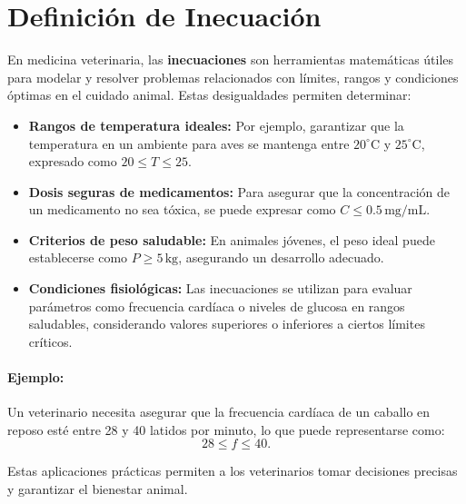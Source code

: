 \documentclass[a4,11pt]{aleph-notas}
\begin{document}
\encabezado

\section{Definición de Inecuación}

En medicina veterinaria, las \textbf{inecuaciones} son herramientas matemáticas útiles para modelar y resolver problemas relacionados con límites, rangos y condiciones óptimas en el cuidado animal. Estas desigualdades permiten determinar:

\begin{itemize}
    \item \textbf{Rangos de temperatura ideales:} Por ejemplo, garantizar que la temperatura en un ambiente para aves se mantenga entre \(20^\circ \text{C}\) y \(25^\circ \text{C}\), expresado como \(20 \leq T \leq 25\).
    
    \item \textbf{Dosis seguras de medicamentos:} Para asegurar que la concentración de un medicamento no sea tóxica, se puede expresar como \(C \leq 0.5 \, \text{mg/mL}\).
    
    \item \textbf{Criterios de peso saludable:} En animales jóvenes, el peso ideal puede establecerse como \(P \geq 5 \, \text{kg}\), asegurando un desarrollo adecuado.
    
    \item \textbf{Condiciones fisiológicas:} Las inecuaciones se utilizan para evaluar parámetros como frecuencia cardíaca o niveles de glucosa en rangos saludables, considerando valores superiores o inferiores a ciertos límites críticos.
\end{itemize}

\paragraph{Ejemplo:} Un veterinario necesita asegurar que la frecuencia cardíaca de un caballo en reposo esté entre 28 y 40 latidos por minuto, lo que puede representarse como:
\[
28 \leq f \leq 40.
\]

Estas aplicaciones prácticas permiten a los veterinarios tomar decisiones precisas y garantizar el bienestar animal.
\end{document}
